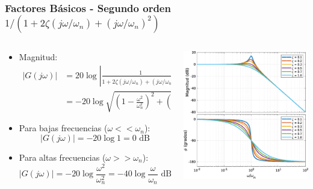 \documentclass[aspectratio=169]{beamer}
\theoremstyle{definition}
\theoremstyle{plain}
\theoremstyle{remark}
\begin{document}
\begin{frame}[<+->]\frametitle{Factores Básicos - Segundo orden $1/(1+2\zeta(j\omega/\omega_n)+(j\omega/\omega_n)^2)$}
\begin{columns}
	\begin{column}{0.5\textwidth}
	\begin{itemize}
		\item Magnitud:
		\begin{align*}
			\left| G(j\omega) \right| &= 20 \log \left| \frac{1}{1+2\zeta(j\omega/\omega_n)+(j\omega/\omega_n)^2} \right|\\
			&= -20 \log \sqrt{\left(1-\frac{\omega^2}{\omega_n^2}\right)^2+\left(2\zeta\frac{\omega}{\omega_n}\right)^2}
		\end{align*}
		\item Para bajas frecuencias ($\omega << \omega_n$):
		\begin{equation*}
			\left| G(j\omega) \right| = -20 \log 1 = 0 \text{ dB}
		\end{equation*}
		\item Para altas frecuencias ($\omega >> \omega_n$):
		\begin{equation*}
			\left| G(j\omega) \right| = -20 \log \frac{\omega^2}{\omega_n^2} = -40 \log \frac{\omega}{\omega_n} \text{ dB}
		\end{equation*}
	\end{itemize}
	\end{column}
	\begin{column}{0.5\textwidth}
	\centering
	\includegraphics[width=6.5cm]{images/bodeSecondOrderIntegral.eps}
	\end{column}
\end{columns}
\end{frame}
\end{document}
